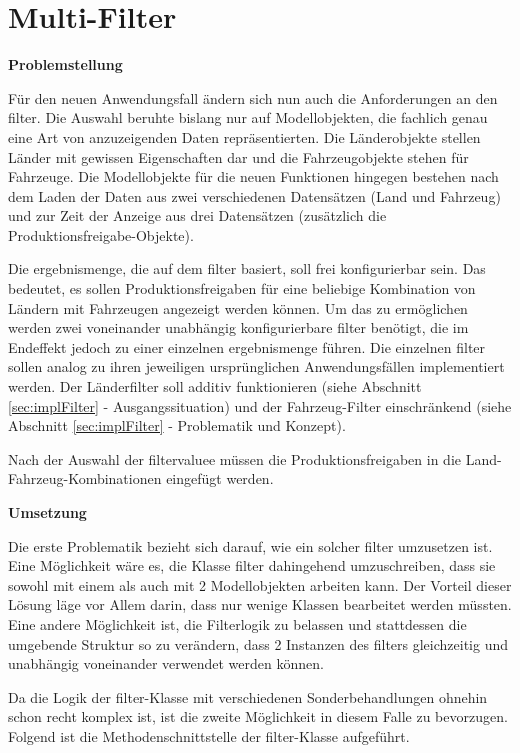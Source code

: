 \section{Multi-Filter} \label{sec:implMulti-Filter}
\textbf{Problemstellung}

Für den neuen Anwendungsfall ändern sich nun auch die Anforderungen an den \gls{filter}. Die Auswahl beruhte bislang nur auf Modellobjekten, die fachlich genau eine Art von anzuzeigenden Daten repräsentierten. Die Länderobjekte stellen Länder mit gewissen Eigenschaften dar und die Fahrzeugobjekte stehen für Fahrzeuge. Die Modellobjekte für die neuen Funktionen hingegen bestehen nach dem Laden der Daten aus zwei verschiedenen Datensätzen (Land und Fahrzeug) und zur Zeit der Anzeige aus drei Datensätzen (zusätzlich die Produktionsfreigabe-Objekte).

Die \gls{ergebnismenge}, die auf dem \gls{filter} basiert, soll frei konfigurierbar sein. Das bedeutet, es sollen Produktionsfreigaben für eine beliebige Kombination von Ländern mit Fahrzeugen angezeigt werden können. Um das zu ermöglichen werden zwei voneinander unabhängig konfigurierbare \gls{filter} benötigt, die im Endeffekt jedoch zu einer einzelnen \gls{ergebnismenge} führen. Die einzelnen \gls{filter} sollen analog zu ihren jeweiligen ursprünglichen Anwendungsfällen implementiert werden. Der Länderfilter soll additiv funktionieren (siehe Abschnitt \ref{sec:implFilter} - Ausgangssituation) und der Fahrzeug-Filter einschränkend (siehe Abschnitt \ref{sec:implFilter} - Problematik und Konzept).

Nach der Auswahl der \gls{filtervalue}e müssen die Produktionsfreigaben in die Land-\-Fahr\-zeug-Kom\-bi\-na\-tio\-nen eingefügt werden.

\textbf{Umsetzung}

Die erste Problematik bezieht sich darauf, wie ein solcher \gls{filter} umzusetzen ist. Eine Möglichkeit wäre es, die Klasse \gls{filter} dahingehend umzuschreiben, dass sie sowohl mit einem als auch mit 2 Modellobjekten arbeiten kann. Der Vorteil dieser Lösung läge vor Allem darin, dass nur wenige Klassen bearbeitet werden müssten.
Eine andere Möglichkeit ist, die Filterlogik zu belassen und stattdessen die umgebende Struktur so zu verändern, dass 2 Instanzen des \gls{filter}s gleichzeitig und unabhängig voneinander verwendet werden können.

Da die Logik der \gls{filter}-Klasse mit verschiedenen Sonderbehandlungen ohnehin schon recht komplex ist, ist die zweite Möglichkeit in diesem Falle zu bevorzugen.
Folgend ist die Methodenschnittstelle der \gls{filter}-Klasse aufgeführt.


